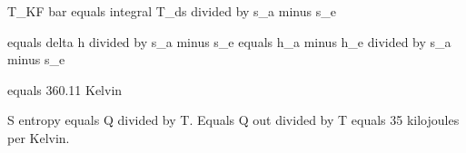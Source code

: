 T_KF bar equals integral T_ds divided by s_a minus s_e  

equals delta h divided by s_a minus s_e equals h_a minus h_e divided by s_a minus s_e  

equals 360.11 Kelvin

S entropy equals Q divided by T.  
Equals Q out divided by T equals 35 kilojoules per Kelvin.